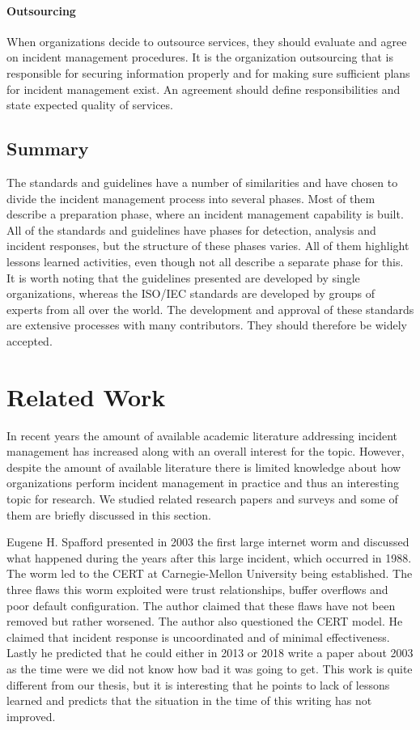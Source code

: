 \paragraph{Outsourcing}
When organizations decide to outsource services, they should evaluate and agree on incident management procedures. It is the organization outsourcing that is responsible for securing information properly and for making sure sufficient plans for incident management exist. An agreement should define responsibilities and state expected quality of services. 



\subsection{Summary}
The standards and guidelines have a number of similarities and have chosen to divide the incident management process into several phases. Most of them describe a preparation phase, where an incident management capability is built. All of the standards and guidelines have phases for detection, analysis and incident responses, but the structure of these phases varies. All of them highlight lessons learned activities, even though not all describe a separate phase for this. It is worth noting that the guidelines presented are developed by single organizations, whereas the ISO/IEC standards are developed by groups of experts from all over the world. The development and approval of these standards are extensive processes with many contributors. They should therefore be widely accepted.

\section{Related Work}
\label{relatedwork}
In recent years the amount of available academic literature addressing incident management has increased along with an overall interest for the topic. However, despite the amount of available literature there is limited knowledge about how organizations perform incident management in practice and thus an interesting topic for research. We studied related research papers and surveys and some of them are briefly discussed in this section.

Eugene H. Spafford presented in 2003\cite{spafford2003failure} the first large internet worm and discussed what happened during the years after this large incident, which occurred in 1988. The worm led to the CERT at Carnegie-Mellon University being established. The three flaws this worm exploited were trust relationships, buffer overflows and poor default configuration. The author claimed that these flaws have not been removed but rather worsened. The author also questioned the CERT model. He claimed that incident response is uncoordinated and of minimal effectiveness. Lastly he predicted that he could either in 2013 or 2018 write a paper about 2003 as the time were we did not know how bad it was going to get. This work is quite different from our thesis, but it is interesting that he points to lack of lessons learned and predicts that the situation in the time of this writing has not improved.

